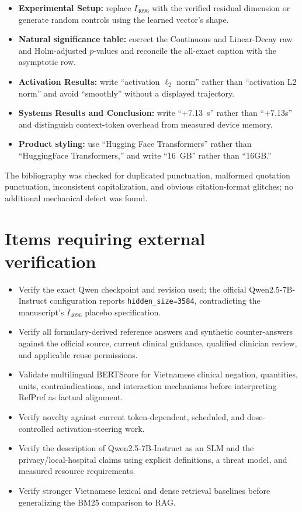 \documentclass[11pt]{article}
\begin{document}
\begin{itemize}
    \item \textbf{Experimental Setup:} replace $I_{4096}$ with the verified residual dimension or generate random controls using the learned vector's shape.
    \item \textbf{Natural significance table:} correct the Continuous and Linear-Decay raw and Holm-adjusted $p$-values and reconcile the all-exact caption with the asymptotic row.
    \item \textbf{Activation Results:} write ``activation $\ell_2$ norm'' rather than ``activation L2 norm'' and avoid ``smoothly'' without a displayed trajectory.
    \item \textbf{Systems Results and Conclusion:} write ``+7.13~s'' rather than ``+7.13s'' and distinguish context-token overhead from measured device memory.
    \item \textbf{Product styling:} use ``Hugging Face Transformers'' rather than ``HuggingFace Transformers,'' and write ``16~GB'' rather than ``16GB.''
\end{itemize}

The bibliography was checked for duplicated punctuation, malformed quotation punctuation, inconsistent capitalization, and obvious citation-format glitches; no additional mechanical defect was found.

\section*{Items requiring external verification}

\begin{itemize}
    \item Verify the exact Qwen checkpoint and revision used; the official Qwen2.5-7B-Instruct configuration reports \texttt{hidden\_size=3584}, contradicting the manuscript's $I_{4096}$ placebo specification.
    \item Verify all formulary-derived reference answers and synthetic counter-answers against the official source, current clinical guidance, qualified clinician review, and applicable reuse permissions.
    \item Validate multilingual BERTScore for Vietnamese clinical negation, quantities, units, contraindications, and interaction mechanisms before interpreting RefPref as factual alignment.
    \item Verify novelty against current token-dependent, scheduled, and dose-controlled activation-steering work.
    \item Verify the description of Qwen2.5-7B-Instruct as an SLM and the privacy/local-hospital claims using explicit definitions, a threat model, and measured resource requirements.
    \item Verify stronger Vietnamese lexical and dense retrieval baselines before generalizing the BM25 comparison to RAG.
\end{itemize}
\end{document}
